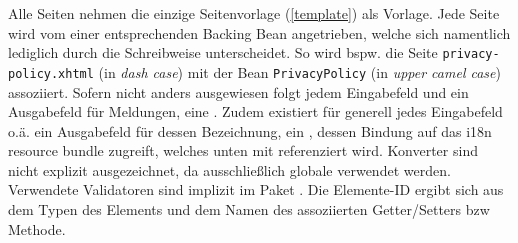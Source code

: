 \documentclass{article}
\begin{document}
\long{}

\newcommand{\component}[2]{\subsubsection{#1 (\texttt{#2})}}

\newcommand{\BTN}{\tag{h}{commandButton}}
\newcommand{\LNK}{\tag{h}{outputLink}}
\newcommand{\INP}{\tag{h}{inputText}}
\newcommand{\PAS}{\tag{h}{inputSecret}}
\newcommand{\DRP}{\tag{h}{selectOneMenu}}
\newcommand{\CHK}{\tag{h}{selectBooleanCheckbox}}
\newcommand{\OUT}{\tag{h}{outputText}}
\newcommand{\LST}{\tag{bibi}{paginatedList}}
\newcommand{\TXT}{\tag{h}{inputTextarea}}
\newcommand{\PRM}{\tag{f}{viewParam}}
\newcommand{\FRM}{\tag{h}{form}}

Alle Seiten nehmen die einzige Seitenvorlage (\ref{template}) als Vorlage.
Jede Seite wird vom einer entsprechenden Backing Bean angetrieben, welche sich namentlich lediglich durch die Schreibweise unterscheidet. So wird bspw. die Seite \texttt{privacy-policy.xhtml} (in \textit{dash case}) mit der Bean \texttt{PrivacyPolicy} (in \textit{upper camel case}) assoziiert.
Sofern nicht anders ausgewiesen folgt jedem Eingabefeld und \PAS ein Ausgabefeld für Meldungen, eine .
Zudem existiert für generell jedes Eingabefeld o.ä. ein Ausgabefeld für dessen Bezeichnung, ein , dessen Bindung
auf das i18n resource bundle zugreift, welches unten mit  referenziert wird.
Konverter sind nicht explizit ausgezeichnet, da ausschließlich globale verwendet werden.
Verwendete Validatoren sind implizit im Paket .
Die Elemente-ID ergibt sich aus dem Typen des Elements und dem Namen des assoziierten Getter/Setters bzw Methode.
\end{document}
